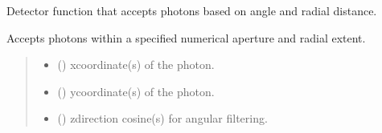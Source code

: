 \documentclass[letterpaper,10pt,english]{sphinxmanual}
\begin{document}
\begin{fulllineitems}
\label{\detokenize{generated/photon_canon.hardware:photon_canon.hardware.cone_of_acceptance}}
\pysigstartsignatures
\pysiglinewithargsret
{}
{\sphinxparamcomma {}\sphinxparamcomma {}\sphinxparamcomma {}\sphinxparamcomma {}\sphinxparamcomma {}}
{}
\pysigstopsignatures
\sphinxAtStartPar
Detector function that accepts photons based on angle and radial distance.

\sphinxAtStartPar
Accepts photons within a specified numerical aperture and radial extent.
\begin{quote}\begin{description}
\begin{itemize}
\item {} 
\sphinxAtStartPar
{} (\sphinxstyleliteralemphasis{\sphinxupquote{{[}}}\sphinxstyleliteralemphasis{\sphinxupquote{, }}\sphinxstyleliteralemphasis{\sphinxupquote{{[}}}\sphinxstyleliteralemphasis{\sphinxupquote{{]}}}\sphinxstyleliteralemphasis{\sphinxupquote{{]}}}) \textendash{} x\sphinxhyphen{}coordinate(s) of the photon.

\item {} 
\sphinxAtStartPar
{} (\sphinxstyleliteralemphasis{\sphinxupquote{{[}}}\sphinxstyleliteralemphasis{\sphinxupquote{, }}\sphinxstyleliteralemphasis{\sphinxupquote{{[}}}\sphinxstyleliteralemphasis{\sphinxupquote{{]}}}\sphinxstyleliteralemphasis{\sphinxupquote{{]}}}) \textendash{} y\sphinxhyphen{}coordinate(s) of the photon.

\item {} 
\sphinxAtStartPar
{} (\sphinxstyleliteralemphasis{\sphinxupquote{{[}}}\sphinxstyleliteralemphasis{\sphinxupquote{, }}\sphinxstyleliteralemphasis{\sphinxupquote{{[}}}\sphinxstyleliteralemphasis{\sphinxupquote{{]}}}\sphinxstyleliteralemphasis{\sphinxupquote{{]}}}) \textendash{} z\sphinxhyphen{}direction cosine(s) for angular filtering.


\end{itemize}
\end{description}
\end{quote}
\end{fulllineitems}
\end{document}
